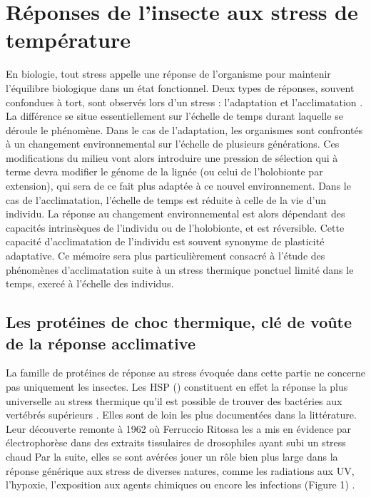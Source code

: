 \section{Réponses de l'insecte aux stress de température}

En biologie, tout stress appelle une réponse de l'organisme pour maintenir l'équilibre biologique dans un état fonctionnel.
Deux types de réponses, souvent confondues à tort, sont observés lors d'un stress : l'adaptation et l'acclimatation \cite{somero2010}.
La différence se situe essentiellement sur l'échelle de temps durant laquelle se déroule le phénomène.
Dans le cas de l'adaptation, les organismes sont confrontés à un changement environnemental sur l'échelle de plusieurs générations.
Ces modifications du milieu vont alors introduire une pression de sélection qui à terme devra modifier le génome de la lignée (ou celui de l'holobionte par extension), qui sera de ce fait plus adaptée à ce nouvel environnement.
Dans le cas de l'acclimatation, l'échelle de temps est réduite à celle de la vie d'un individu. La réponse au changement environnemental est alors dépendant des capacités intrinsèques de l'individu ou de l'holobionte, et est réversible.
Cette capacité d'acclimatation de l'individu est souvent synonyme de plasticité adaptative.
Ce mémoire sera plus particulièrement consacré à l'étude des phénomènes d'acclimatation suite à un stress thermique ponctuel limité dans le temps, exercé à l'échelle des individus.

	\subsection{Les protéines de choc thermique, clé de voûte de la réponse acclimative}

	La famille de protéines de réponse au stress évoquée dans cette partie ne concerne pas uniquement les insectes.
	Les HSP () constituent en effet la réponse la plus universelle au stress thermique qu'il est possible de trouver des bactéries aux vertébrés supérieurs \cite{lindquist1986}.
	Elles sont de loin les plus documentées dans la littérature.
	Leur découverte remonte à 1962 où Ferruccio Ritossa les a mis en évidence par électrophorèse dans des extraits tissulaires de drosophiles ayant subi un stress chaud \cite{ritossa1996, ritossa1962} %
	Par la suite, elles se sont avérées jouer un rôle bien plus large dans la réponse générique aux stress de diverses natures, comme les radiations aux UV, l'hypoxie, l'exposition aux agents chimiques ou encore les infections (Figure 1) \cite{sorensen2003}.

